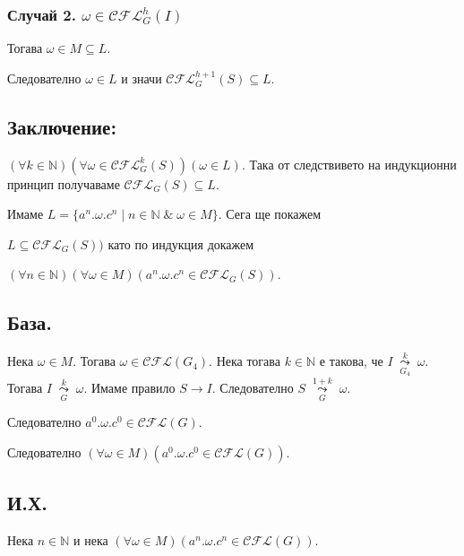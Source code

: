 \documentclass[12pt]{article}
\begin{document}
\subsubsection*{Случай 2. \(\omega \in \mathcal{CFL}_{G}^h(I)\)}
Тогава \(\omega \in M \subseteq L\).

\vspace*{5mm}

\par Следователно \(\omega \in L\) и значи \(\mathcal{CFL}_{G}^{h + 1}(S) \subseteq L\).

\subsection*{Заключение:}
\((\forall k \in \mathbb N)(\forall \omega \in \mathcal{CFL}_G^k(S))(\omega \in L )\).
Така от следствивето на индукционни принцип получаваме \(\mathcal{CFL}_G(S) \subseteq L\).

\vspace*{5mm}

\par Имаме \(L = \{a^n.\omega.c^n \mid n \in \mathbb{N} \;\&\; \omega \in M\}\).
Сега ще покажем 

\(L \subseteq \mathcal{CFL}_G(S))\) като по индукция докажем


\((\forall n \in \mathbb{N})(\forall \omega \in M)(a^n.\omega.c^n \in \mathcal{CFL}_G(S))\).

\subsection*{База.}
Нека \(\omega \in M\). Тогава \(\omega \in \mathcal{CFL}(G_4)\).
Нека тогава \(k \in \mathbb{N}\) е такова, че \(I \;\underset{G_4}{\overset{k}{\leadsto}}\; \omega\). Тогава \(I \;\underset{G}{\overset{k}{\leadsto}}\; \omega\).
Имаме правило \(S \to I\). Следователно \(S \;\underset{G}{\overset{1 + k}{\leadsto}}\; \omega\).

\vspace*{4mm}

\par Следователно \(a^0.\omega.c^0 \in \mathcal{CFL}(G)\).

Следователно \((\forall \omega \in M)(a^0.\omega.c^0 \in \mathcal{CFL}(G))\).

\subsection*{И.Х.}
Нека \(n \in \mathbb{N}\) и нека \((\forall \omega \in M)(a^n.\omega.c^n \in \mathcal{CFL}(G))\).
\end{document}
